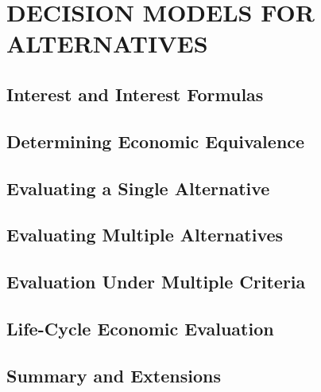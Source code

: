 \chapter{DECISION MODELS FOR ALTERNATIVES}\label{chap:11}

\section{Interest and Interest Formulas}


\section{Determining Economic Equivalence}


\section{Evaluating a Single Alternative}


\section{Evaluating Multiple Alternatives}


\section{Evaluation Under Multiple Criteria}


\section{Life-Cycle Economic Evaluation}


\section{Summary and Extensions}


